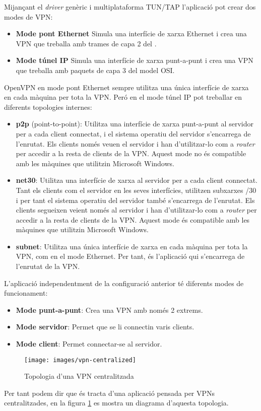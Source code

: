 Mijançant el \emph{driver} genèric i multiplataforma TUN/TAP l'aplicació pot crear dos modes de VPN:
\begin{itemize}
\item \textbf{Mode pont Ethernet}
Simula una interfície de xarxa Ethernet i crea una VPN que treballa amb trames de capa 2 del .
\item \textbf{Mode túnel IP}
Simula una interfície de xarxa punt-a-punt i crea una VPN que treballa amb paquets de capa 3 del model OSI.
\end{itemize}

OpenVPN en mode pont Ethernet sempre utilitza una única interfície de xarxa en cada màquina per tota la VPN. Peró en el mode túnel IP pot treballar en diferents topologies internes:
\begin{itemize}
\item \textbf{p2p} (point-to-point): Utilitza una interfície de xarxa punt-a-punt al servidor per a cada client connectat, i el sistema operatiu del servidor s'encarrega de l'enrutat. Els clients només veuen el servidor i han d'utilitzar-lo com a \emph{router} per accedir a la resta de clients de la VPN. Aquest mode no és compatible amb les màquines que utilitzin Microsoft Windows.
\item \textbf{net30}: Utilitza una interfície de xarxa al servidor per a cada client connectat. Tant els clients com el servidor en les seves interfícies, utilitzen subxarxes /30 i per tant el sistema operatiu del servidor també s'encarrega de l'enrutat. Els clients segueixen veient només al servidor i han d'utilitzar-lo com a \emph{router} per accedir a la resta de clients de la VPN. Aquest mode és compatible amb les màquines que utilitzin Microsoft Windows.
\item \textbf{subnet}: Utilitza una única interfície de xarxa en cada màquina per tota la VPN, com en el mode Ethernet. Per tant, és l'aplicació qui s'encarrega de l'enrutat de la VPN.
\end{itemize}

L'aplicació independentment de la configuració anterior té diferents modes de funcionament:
\begin{itemize}
\item \textbf{Mode punt-a-punt}: Crea una VPN amb només 2 extrems.
\item \textbf{Mode servidor}: Permet que se li connectin varis clients.
\item \textbf{Mode client}: Permet connectar-se al servidor.
\end{itemize}
\begin{figure}[htb]
\centering
\texttt{[image: images/vpn-centralized]}
\caption{Topologia d'una VPN centralitzada}
\label{F:vpn-centralized}
\end{figure}
Per tant podem dir que és tracta d'una aplicació pensada per VPNs centralitzades, en la figura \ref{F:vpn-centralized} es mostra un diagrama d'aquesta topologia.

